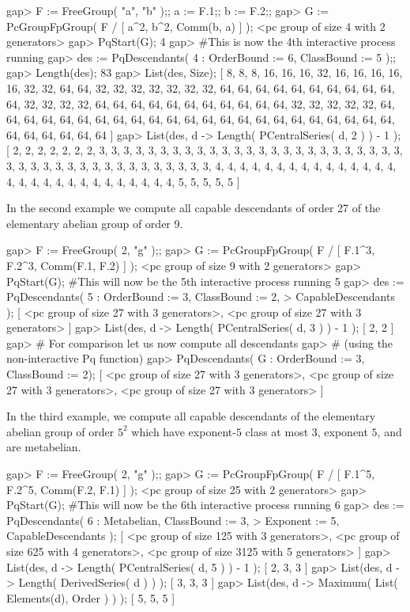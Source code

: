 \beginexample
gap> F := FreeGroup( "a", "b" );; a := F.1;; b := F.2;;
gap> G := PcGroupFpGroup( F / [ a^2, b^2, Comm(b, a) ] );
<pc group of size 4 with 2 generators>
gap> PqStart(G);
4
gap> #This is now the 4th interactive process running
gap> des := PqDescendants( 4 : OrderBound := 6, ClassBound := 5 );;
gap> Length(des);
83
gap> List(des, Size);
[ 8, 8, 8, 16, 16, 16, 32, 16, 16, 16, 16, 16, 32, 32, 64, 64, 32, 32, 32, 
  32, 32, 32, 32, 64, 64, 64, 64, 64, 64, 64, 64, 64, 64, 64, 32, 32, 32, 32, 
  64, 64, 64, 64, 64, 64, 64, 64, 64, 64, 64, 32, 32, 32, 32, 32, 64, 64, 64, 
  64, 64, 64, 64, 64, 64, 64, 64, 64, 64, 64, 64, 64, 64, 64, 64, 64, 64, 64, 
  64, 64, 64, 64, 64, 64, 64 ]
gap> List(des, d -> Length( PCentralSeries( d, 2 ) ) - 1 );
[ 2, 2, 2, 2, 2, 2, 2, 3, 3, 3, 3, 3, 3, 3, 3, 3, 3, 3, 3, 3, 3, 3, 3, 3, 3, 
  3, 3, 3, 3, 3, 3, 3, 3, 3, 3, 3, 3, 3, 3, 3, 3, 3, 3, 3, 3, 3, 3, 3, 3, 4, 
  4, 4, 4, 4, 4, 4, 4, 4, 4, 4, 4, 4, 4, 4, 4, 4, 4, 4, 4, 4, 4, 4, 4, 4, 4, 
  4, 4, 4, 5, 5, 5, 5, 5 ]
\endexample

In the second example we compute all  capable descendants of order  27 of
the  elementary abelian group of order 9.  

\beginexample
gap> F := FreeGroup( 2, "g" );;                                 
gap> G := PcGroupFpGroup( F / [ F.1^3, F.2^3, Comm(F.1, F.2) ] );
<pc group of size 9 with 2 generators>
gap> PqStart(G); #This will now be the 5th interactive process running
5
gap> des := PqDescendants( 5 : OrderBound := 3, ClassBound := 2,
>                              CapableDescendants );
[ <pc group of size 27 with 3 generators>, 
  <pc group of size 27 with 3 generators> ]
gap> List(des, d -> Length( PCentralSeries( d, 3 ) ) - 1 );
[ 2, 2 ]
gap> # For comparison let us now compute all descendants
gap> # (using the non-interactive Pq function)
gap> PqDescendants( G : OrderBound := 3, ClassBound := 2);
[ <pc group of size 27 with 3 generators>, 
  <pc group of size 27 with 3 generators>, 
  <pc group of size 27 with 3 generators> ]
\endexample

In  the  third  example,  we  compute  all  capable  descendants  of  the
elementary abelian group of order  $5^2$ which have exponent-$5$ class at
most $3$, exponent $5$, and are metabelian.

\beginexample
gap> F := FreeGroup( 2, "g" );;
gap> G := PcGroupFpGroup( F / [ F.1^5, F.2^5, Comm(F.2, F.1) ] );
<pc group of size 25 with 2 generators>
gap> PqStart(G); #This will now be the 6th interactive process running
6
gap> des := PqDescendants( 6 : Metabelian, ClassBound := 3,
>                              Exponent := 5, CapableDescendants );
[ <pc group of size 125 with 3 generators>, 
  <pc group of size 625 with 4 generators>, 
  <pc group of size 3125 with 5 generators> ]
gap> List(des, d -> Length( PCentralSeries( d, 5 ) ) - 1 );
[ 2, 3, 3 ]
gap> List(des, d -> Length( DerivedSeries( d ) ) );
[ 3, 3, 3 ]
gap> List(des, d -> Maximum( List( Elements(d), Order ) ) );
[ 5, 5, 5 ]
\endexample

